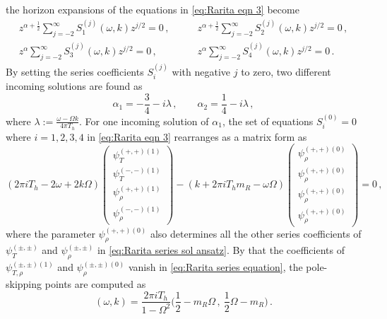 \documentclass[11pt,a4paper]{article}
\begin{document}
the horizon expansions of the equations in \eqref{eq:Rarita eqn 3} become
\begin{equation}
\begin{split}
    z^{\alpha+\frac{1}{2}} \sum^{\infty}_{j=-2} S_1^{(j)}(\omega, k) z^{j/2} = 0 \,, \qquad  & z^{\alpha+\frac{1}{2}} \sum^{\infty}_{j=-2} S_2^{(j)}(\omega, k) z^{j/2} =0 \,, \\
    z^{\alpha} \sum^{\infty}_{j=-2} S_3^{(j)}(\omega, k) z^{j/2} =0 \,, \qquad  & z^{\alpha} \sum^{\infty}_{j=-2} S_4^{(j)}(\omega, k) z^{j/2} =0 \,.
\end{split}
\end{equation}
By setting the series coefficients $S_i^{(j)}$ with negative $j$ to zero, two different incoming solutions are found as
\begin{equation}
    \alpha_1 = - \frac{3}{4} - i \lambda\,, \qquad \alpha_2 = \frac{1}{4} - i \lambda \,,
\end{equation}
where $\lambda := \frac{\omega - \Omega k}{4 \pi T_h}$. For one incoming solution of $\alpha_1$, the set of equations $S_i^{(0)}=0$ where $i=1,2,3,4$ in \eqref{eq:Rarita eqn 3} rearranges as a matrix form as
\begin{equation} \label{eq:Rarita series equation}
    (2\pi i T_h - 2 \omega +2 k \Omega)
    \begin{pmatrix}
    \psi_T^{(+,+)(1)}\\  \psi_T^{(-,-)(1)}\\
    \psi_\rho^{(+,+)(1)}\\ \psi_\rho^{(-,-)(1)}
    \end{pmatrix}
    -
    (k + 2\pi i T_h m_R - \omega \Omega)
    \begin{pmatrix}
    \psi_\rho^{(+,+)(0)}\\ \psi_\rho^{(+,+)(0)}\\ \psi_\rho^{(+,+)(0)}\\  \psi_\rho^{(+,+)(0)}
    \end{pmatrix}=0\,,
\end{equation}
where the parameter $\psi_\rho^{(+,+)(0)}$ also determines all the other series coefficients of $\psi_T^{(\pm,\pm)}$ and $\psi_\rho^{(\pm,\pm)}$ in \eqref{eq:Rarita series sol ansatz}. By that the coefficients of $\psi_{T,\rho}^{(\pm,\pm)(1)}$ and $\psi_{\rho}^{(\pm,\pm)(0)}$ vanish in \eqref{eq:Rarita series equation}, the pole-skipping points are computed as
\begin{equation}
    (\omega, k)=\frac{2\pi i T_h}{1-\Omega^2}\bigg( \frac{1}{2} - m_R \Omega\,,~ \frac{1}{2}\Omega - m_R \bigg)\,.
\end{equation}
\end{document}
